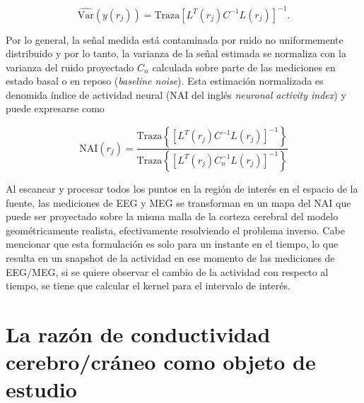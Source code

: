 \begin{equation}
	\label{beamformer3}
\widehat{\text{Var}}(y(r_j)) = \text{Traza}[L^{T}(r_j)C^{-1}L(r_j)]^{-1}.
\end{equation}

Por lo general, la señal medida está contaminada por ruido no uniformemente distribuido y por lo tanto, la varianza de la señal estimada se normaliza con la varianza del ruido proyectado $C_n$ calculada sobre parte de las mediciones en estado basal o en reposo (\emph{baseline noise}). Esta estimación normalizada es denomida índice de actividad neural (NAI del inglés \emph{neuronal activity index}) \cite{VanVeen1997} y puede expresarse como

\begin{equation}
	\label{beamformer4}
\text{NAI}(r_j) = \frac{\text{Traza}\left\{[L^{T}(r_j)C^{-1}L(r_j)]^{-1}\right\}}{\text{Traza}\left\{[L^{T}(r_j)C_n^{-1}L(r_j)]^{-1}\right\}}
\end{equation}

Al escanear y procesar todos los puntos en la región de interés en el espacio de la fuente, las mediciones de EEG y MEG se transforman en un mapa del NAI que puede ser proyectado sobre la misma malla de la corteza cerebral del modelo geométricamente realista, efectivamente resolviendo el problema inverso. Cabe mencionar que esta formulación es solo para un instante en el tiempo, lo que resulta en un snapshot de la actividad en ese momento de las mediciones de EEG/MEG, si se quiere observar el cambio de la actividad con respecto al tiempo, se tiene que calcular el kernel para el intervalo de interés.

\section{La razón de conductividad cerebro/cráneo como objeto de estudio}
\label{sec:intro:study}

